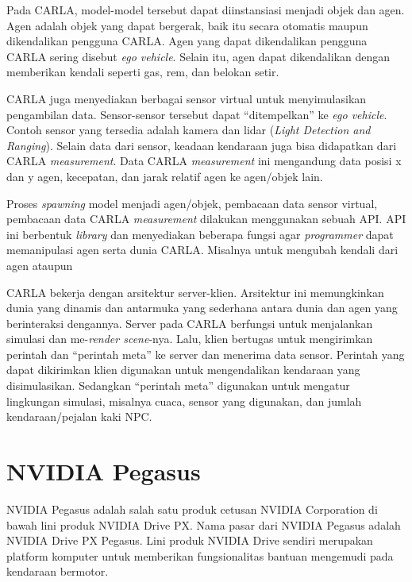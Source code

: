 Pada CARLA, model-model tersebut dapat diinstansiasi menjadi objek dan agen.
Agen adalah objek yang dapat bergerak, baik itu secara otomatis maupun
dikendalikan pengguna CARLA. Agen yang dapat dikendalikan pengguna CARLA
sering disebut \textit{ego vehicle}. Selain itu, agen dapat dikendalikan
dengan memberikan kendali seperti gas, rem, dan belokan setir.

CARLA juga menyediakan berbagai sensor virtual untuk menyimulasikan pengambilan
data. Sensor-sensor tersebut dapat ``ditempelkan'' ke \textit{ego vehicle}.
Contoh sensor yang tersedia adalah kamera dan lidar (\textit{Light Detection and
	Ranging}). Selain data dari sensor, keadaan kendaraan juga bisa didapatkan
dari CARLA \textit{measurement}. Data CARLA \textit{measurement} ini mengandung
data posisi x dan y agen, kecepatan, dan jarak relatif agen ke agen/objek lain.

Proses \textit{spawning} model menjadi agen/objek, pembacaan data sensor virtual,
pembacaan data CARLA \textit{measurement} dilakukan menggunakan sebuah API. API
ini berbentuk \textit{library} dan menyediakan beberapa fungsi agar
\textit{programmer} dapat memanipulasi agen serta dunia CARLA. Misalnya untuk
mengubah kendali dari agen ataupun

CARLA bekerja dengan arsitektur server-klien. Arsitektur ini memungkinkan dunia
yang dinamis dan antarmuka yang sederhana antara dunia dan agen yang
berinteraksi dengannya. Server pada CARLA berfungsi untuk menjalankan simulasi
dan me-\textit{render scene}-nya. Lalu, klien bertugas untuk mengirimkan
perintah dan ``perintah meta'' ke server dan menerima data sensor. Perintah yang
dapat dikirimkan klien digunakan untuk mengendalikan kendaraan yang
disimulasikan. Sedangkan ``perintah meta'' digunakan untuk mengatur lingkungan
simulasi, misalnya cuaca, sensor yang digunakan, dan jumlah kendaraan/pejalan
kaki NPC.

\section{NVIDIA Pegasus}\label{chapter-2-section-pegasus}

NVIDIA Pegasus adalah salah satu produk cetusan NVIDIA Corporation di bawah lini
produk NVIDIA Drive PX. Nama pasar dari NVIDIA Pegasus adalah NVIDIA Drive
PX Pegasus. Lini produk NVIDIA Drive sendiri merupakan platform komputer untuk
memberikan fungsionalitas bantuan mengemudi pada kendaraan bermotor.

